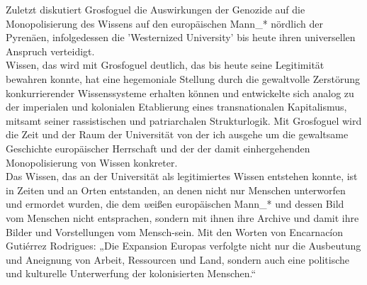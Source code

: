 \noindent Zuletzt diskutiert Grosfoguel die Auswirkungen der Genozide auf die
Monopolisierung des Wissens auf den europäischen Mann\_* nördlich der Pyrenäen,
infolgedessen die 'Westernized University' bis heute ihren universellen
Anspruch verteidigt.\footnotemark {}\\

\noindent Wissen, das wird mit Grosfoguel deutlich, das bis heute seine Legitimität
bewahren konnte, hat eine hegemoniale Stellung durch die gewaltvolle Zerstörung
konkurrierender Wissenssysteme erhalten können und entwickelte sich analog zu
der imperialen und kolonialen Etablierung eines transnationalen Kapitalismus,
mitsamt seiner rassistischen und patriarchalen Strukturlogik. 
Mit Grosfoguel wird die Zeit und der Raum der Universität von der ich ausgehe um die
gewaltsame Geschichte europäischer Herrschaft und der der damit einhergehenden
Monopolisierung von Wissen konkreter.\\

\noindent Das Wissen, das an der Universität als legitimiertes Wissen entstehen konnte,
ist in Zeiten und an Orten entstanden, an denen nicht nur Menschen unterworfen
und ermordet wurden, die dem \textit{w}eißen europäischen Mann\_* und dessen Bild vom
Menschen nicht entsprachen, sondern mit ihnen ihre Archive und damit ihre
Bilder und Vorstellungen vom Mensch-sein. Mit den Worten von Encarnacíon
Gutiérrez Rodrigues: „Die Expansion Europas verfolgte nicht nur die Ausbeutung
und Aneignung von Arbeit, Ressourcen und Land, sondern auch eine politische und
kulturelle Unterwerfung der kolonisierten Menschen.“\footnotemark
{}
